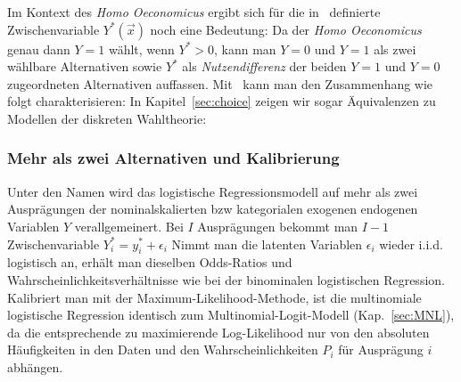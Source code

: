 Im Kontext des \emph{Homo Oeconomicus} ergibt sich f\"ur die
in~ definierte Zwischenvariable $Y^*(\vec{x})$ noch
eine Bedeutung: Da der \emph{Homo Oeconomicus} genau dann $Y=1$ w\"ahlt, wenn $Y^*>0$, kann
man $Y=0$ und $Y=1$ als zwei w\"ahlbare Alternativen sowie 
$Y^*$ als \emph{Nutzendifferenz} der beiden $Y=1$ und $Y=0$
zugeordneten Alternativen auffassen. Mit~ kann man den
Zusammenhang wie folgt charakterisieren:
%
In Kapitel~\ref{sec:choice} zeigen wir sogar \"Aquivalenzen zu
Modellen der diskreten Wahltheorie:


\subsubsection{Mehr als zwei Alternativen und Kalibrierung}

Unter den Namen  wird das
logistische Regressionsmodell auf mehr als zwei Auspr\"agungen der
nominalskalierten bzw kategorialen exogenen endogenen Variablen $Y$
verallgemeinert. Bei $I$ Auspr\"agungen bekommt man $I-1$
Zwischenvariable $Y^*_i=y^*_i+\epsilon_i$ Nimmt man die latenten Variablen
$\epsilon_i$ wieder i.i.d. logistisch an, erh\"alt man dieselben Odds-Ratios und
Wahrscheinlichkeitsverh\"altnisse wie bei der binominalen logistischen
Regression. Kalibriert man mit der Maximum-Likelihood-Methode, ist die
multinomiale logistische Regression identisch zum
Multinomial-Logit-Modell (Kap.~\ref{sec:MNL}), da die entsprechende zu
maximierende Log-Likelihood nur von den absoluten H\"aufigkeiten in den Daten
und den Wahrscheinlichkeiten $P_i$ f\"ur Auspr\"agung $i$ abh\"angen. 

